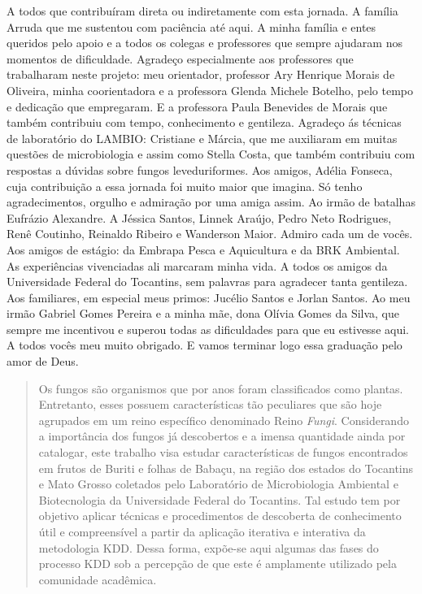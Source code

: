 \documentclass[tcc2]{classe_uftex/uftex}
\begin{document}
  \begin{acknowledgement}
   A todos que contribuíram direta ou indiretamente com esta jornada. A família Arruda que me sustentou com paciência até aqui. A minha família e entes queridos pelo apoio e a todos os colegas e professores que sempre ajudaram nos momentos de dificuldade.
   Agradeço especialmente aos professores que trabalharam neste projeto: meu orientador, professor Ary Henrique Morais de Oliveira, minha coorientadora e a professora Glenda Michele Botelho, pelo tempo e dedicação que empregaram. E a professora Paula Benevides de Morais que também contribuiu com tempo, conhecimento e gentileza. 
   Agradeço ás técnicas de laboratório do LAMBIO: Cristiane e Márcia, que me auxiliaram em muitas questões de microbiologia e assim como Stella Costa, que também contribuiu com respostas a dúvidas sobre fungos leveduriformes.
   Aos amigos, Adélia Fonseca, cuja contribuição a essa jornada foi muito maior que imagina. Só tenho agradecimentos, orgulho e admiração por uma amiga assim. Ao irmão de batalhas Eufrázio Alexandre. A Jéssica Santos, Linnek Araújo, Pedro Neto Rodrigues, Renê Coutinho, Reinaldo Ribeiro e Wanderson Maior. Admiro cada um de vocês.
   Aos amigos de estágio: da Embrapa Pesca e Aquicultura e da BRK Ambiental. As experiências vivenciadas ali marcaram minha vida.
   A todos os amigos da Universidade Federal do Tocantins, sem palavras para agradecer tanta gentileza. 
   Aos familiares, em especial meus primos: Jucélio Santos e Jorlan Santos. Ao meu irmão Gabriel Gomes Pereira e a minha mãe, dona Olívia Gomes da Silva, que sempre me incentivou e superou todas as dificuldades para que eu estivesse aqui. A todos vocês meu muito obrigado. E vamos terminar logo essa graduação pelo amor de Deus.
  \end{acknowledgement}

  \begin{abstract}
  Os fungos são organismos que por anos foram classificados como plantas. Entretanto, esses possuem características tão peculiares que são hoje agrupados em um reino específico denominado Reino \emph{Fungi}. Considerando a importância dos fungos já descobertos e a imensa quantidade ainda por catalogar, este trabalho visa estudar características de fungos encontrados em frutos de Buriti e folhas de Babaçu, na região dos estados do Tocantins e Mato Grosso coletados pelo Laboratório de Microbiologia Ambiental e Biotecnologia da Universidade Federal do Tocantins. Tal estudo tem por objetivo aplicar técnicas e procedimentos de descoberta de conhecimento útil e compreensível a partir da aplicação iterativa e interativa da metodologia KDD. Dessa forma, expõe-se aqui algumas das fases do processo KDD sob a percepção de que este é amplamente utilizado pela comunidade acadêmica.
  \end{abstract}
\end{document}
